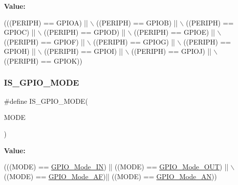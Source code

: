 {\bfseries Value\+:}
\begin{DoxyCode}
(((PERIPH) == GPIOA) || \(\backslash\)
                                    ((PERIPH) == GPIOB) || \(\backslash\)
                                    ((PERIPH) == GPIOC) || \(\backslash\)
                                    ((PERIPH) == GPIOD) || \(\backslash\)
                                    ((PERIPH) == GPIOE) || \(\backslash\)
                                    ((PERIPH) == GPIOF) || \(\backslash\)
                                    ((PERIPH) == GPIOG) || \(\backslash\)
                                    ((PERIPH) == GPIOH) || \(\backslash\)
                                    ((PERIPH) == GPIOI) || \(\backslash\)
                                    ((PERIPH) == GPIOJ) || \(\backslash\)
                                    ((PERIPH) == GPIOK))
\end{DoxyCode}
\mbox{\label{group___g_p_i_o_gacc5fde3eef57ec3c558c11d0011d900c}} 
\subsubsection{\texorpdfstring{I\+S\+\_\+\+G\+P\+I\+O\+\_\+\+M\+O\+DE}{IS\_GPIO\_MODE}}
{\footnotesize\ttfamily \#define I\+S\+\_\+\+G\+P\+I\+O\+\_\+\+M\+O\+DE(\begin{DoxyParamCaption}\item[{}]{M\+O\+DE }\end{DoxyParamCaption})}

{\bfseries Value\+:}
\begin{DoxyCode}
(((MODE) == \mbox{\hyperlink{group___g_p_i_o_gga1347339e1c84a196fabbb31205eec5d4a484aa18a6156ce916049b334ba1839de}{GPIO\_Mode\_IN}})  || ((MODE) == \mbox{\hyperlink{group___g_p_i_o_gga1347339e1c84a196fabbb31205eec5d4a60f1d530f4119efcad8e1a68c890c6a6}{GPIO\_Mode\_OUT}}) || \(\backslash\)
                            ((MODE) == \mbox{\hyperlink{group___g_p_i_o_gga1347339e1c84a196fabbb31205eec5d4a6d44c35c6c5008d85bac9251a867e701}{GPIO\_Mode\_AF}})|| ((MODE) == 
      \mbox{\hyperlink{group___g_p_i_o_gga1347339e1c84a196fabbb31205eec5d4a6e5c0d7e6d2e22b834b24e1ca1d6d0db}{GPIO\_Mode\_AN}}))
\end{DoxyCode}
\mbox{\label{group___g_p_i_o_gae30c92591d1f29dbd594ac3cd855b503}} 
